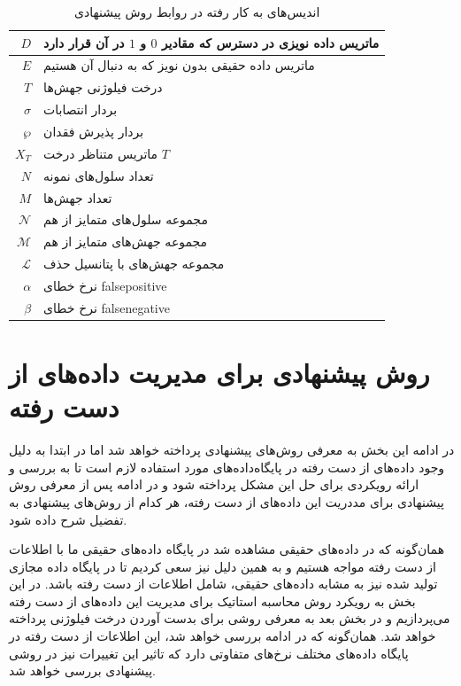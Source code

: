 	\begin{table}[ht]
	\caption{اندیس‌های به کار رفته در روابط روش پیشنهادی}
	\label{tab:ch_pm:firstpmIndices}
	\centering
	\onehalfspacing
	\begin{tabularx}{0.9\textwidth}{|r|X|}
		\hline
		$D$	& ماتریس داده نویزی در دسترس که مقادیر $0$ و $1$ در آن قرار دارد \\
		\hline
		$E$	& ماتریس داده حقیقی بدون نویز که به دنبال آن هستیم \\
		\hline
		$T$	& درخت فیلوژنی جهش‌ها \\
		\hline
		$\sigma$	 & بردار انتصابات \\
		\hline
		$\wp$ & بردار پذیرش فقدان$  $ \\
		\hline
		$X_T$	& ماتریس متناظر درخت $T$ \\
		\hline
		$N$	& تعداد سلول‌های نمونه \\
		\hline
		$M$	& تعداد جهش‌ها \\
		\hline
		$\mathcal{N}$ & مجموعه سلول‌های متمایز از هم \\
		\hline
		$\mathcal{M}$ & مجموعه جهش‌های متمایز از هم \\
		\hline
		$\mathcal{L}$ & مجموعه جهش‌های با پتانسیل حذف \\
		\hline
		$\alpha$	&  نرخ خطای \gls{falsepositive} \\
		\hline
		$\beta$	& نرخ خطای \gls{falsenegative} \\
		\hline
	\end{tabularx}
\end{table}



\section{روش پیشنهادی برای مدیریت داده‌های از دست رفته}

در ادامه این بخش به معرفی روش‌های پیشنهادی پرداخته خواهد شد اما در ابتدا به دلیل وجود داده‌های از دست رفته در پایگاه‌داده‌های مورد استفاده لازم است تا به بررسی و ارائه رویکردی برای حل این مشکل پرداخته شود و در ادامه پس از معرفی روش پیشنهادی برای مددریت این داده‌های از دست رفته، هر کدام از روش‌های پیشنهادی به تفضیل شرح داده شود.

همان‌گونه که در داده‌های حقیقی مشاهده شد در پایگاه داده‌های حقیقی ما با اطلاعات از دست رفته مواجه هستیم و به همین دلیل نیز سعی کردیم تا در پایگاه داده مجازی تولید شده نیز به مشابه داده‌های حقیقی، شامل اطلاعات از دست رفته باشد. در این بخش به رویکرد روش محاسبه استاتیک برای مدیریت این داده‌های از دست رفته می‌پردازیم و در بخش بعد به معرفی روشی برای بدست آوردن درخت فیلوژنی پرداخته خواهد شد. همان‌گونه که در ادامه بررسی خواهد شد، این اطلاعات از دست رفته در پایگاه داده‌های مختلف نرخ‌های متفاوتی دارد که تاثیر این تغییرات نیز در روشی پیشنهادی بررسی خواهد شد.

